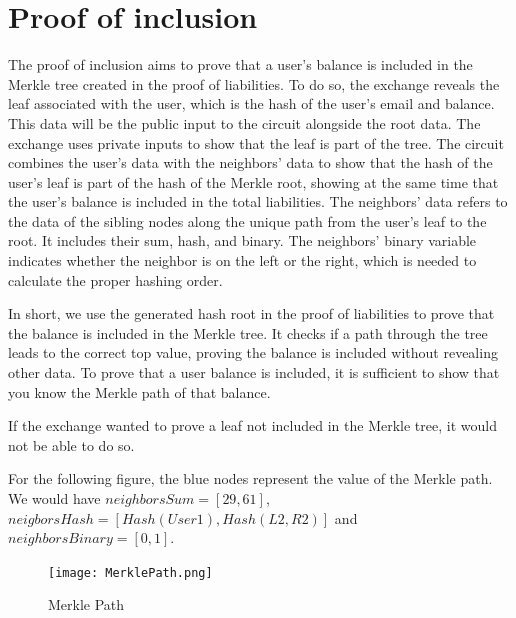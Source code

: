\section{Proof of inclusion}
\label{subsec:pi}
The proof of inclusion aims to prove that a user's balance is included in the Merkle tree created in the proof of liabilities.
To do so, the exchange reveals the leaf associated with the user, which is the hash of the user's email and balance.
This data will be the public input to the circuit alongside the root data.
The exchange uses private inputs to show that the leaf is part of the tree. 
The circuit combines the user's data with the neighbors' data to show that the hash of the user's leaf is part of the hash of the Merkle root, showing at the same time that the user's balance is included in the total liabilities.
The neighbors' data refers to the data of the sibling nodes along the unique path from the user's leaf to the root.
It includes their sum, hash, and binary. The neighbors' binary variable indicates whether the neighbor is on the left or the right, which is needed to calculate the proper hashing order. 

In short, we use the generated hash root in the proof of liabilities to prove that the balance is included in the Merkle tree.
It checks if a path through the tree leads to the correct top value, proving the balance is included without revealing other data.
To prove that a user balance is included, it is sufficient to show that you know the Merkle path of that balance. 

If the exchange wanted to prove a leaf not included in the Merkle tree, it would not be able to do so. 

For the following figure, the blue nodes represent the value of the Merkle path.
We would have $neighborsSum=[29,61]$, $neigborsHash=[Hash(User1),Hash(L2,R2)]$ and $neighborsBinary=[0,1]$.
   \begin{figure}[H]
   \centering
   \texttt{[image: MerklePath.png]}
   \caption{Merkle Path}
   \label{overflow}
   \end{figure}

